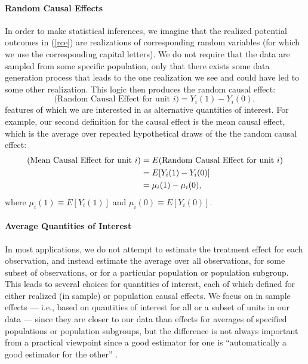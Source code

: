 \documentclass[11pt,titlepage]{article}
\begin{document}
\paragraph{Random Causal Effects} In order to make statistical
inferences, we imagine that the realized potential outcomes in
(\ref{rce}) are realizations of corresponding random variables (for
which we use the corresponding capital letters).  We do not require
that the data are sampled from some specific population, only that
there exists some data generation process that leads to the one
realization we see and could have led to some other realization.  This
logic then produces the random causal effect:
\begin{equation}
  \label{rance}
  \text{(Random Causal Effect for unit $i$)}  = Y_i(1) - Y_i(0),
\end{equation}
features of which we are interested in as alternative quantities of
interest.  For example, our second definition for the causal effect is
the mean causal effect, which is the average over repeated
hypothetical draws of the the random causal effect:
\begin{align}
  \label{meance} \text{(Mean Causal Effect for unit $i$)}
  &= E(\text{Random Causal Effect for unit $i$})\\
  &= E[Y_i(1) - Y_i(0)]\\ \notag &= \mu_i(1) - \mu_i(0),
\end{align}
where $\mu_i(1)\equiv E[Y_i(1)]$ and $\mu_i(0)\equiv E[Y_i(0)]$.

\paragraph{Average Quantities of Interest}
In most applications, we do not attempt to estimate the treatment
effect for each observation, and instead estimate the average over all
observations, for some subset of observations, or for a particular
population or population subgroup.  This leads to several choices for
quantities of interest, each of which defined for either realized (in
sample) or population causal effects.  We focus on in sample effects
--- i.e., based on quantities of interest for all or a subset of units
in our data --- since they are closer to our data than effects for
averages of specified populations or population subgroups, but the
difference is not always important from a practical viewpoint since a
good estimator for one is ``automatically a good estimator for the
other'' \citep[p.6][]{Imbens04}.
\end{document}
